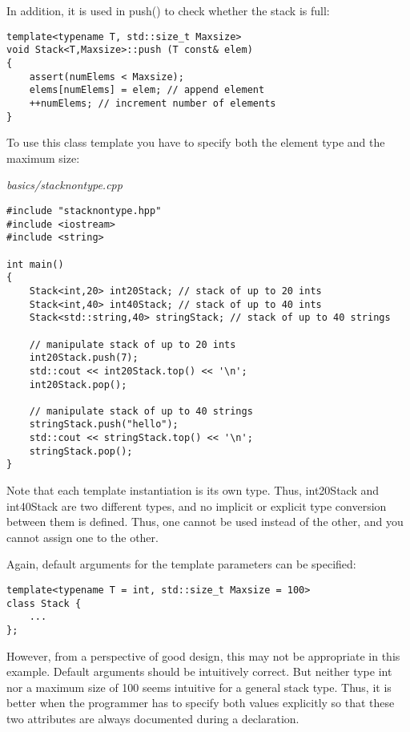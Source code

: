 In addition, it is used in push() to check whether the stack is full:

\begin{lstlisting}[style=styleCXX]
template<typename T, std::size_t Maxsize>
void Stack<T,Maxsize>::push (T const& elem)
{
	assert(numElems < Maxsize);
	elems[numElems] = elem; // append element
	++numElems; // increment number of elements
}
\end{lstlisting}

To use this class template you have to specify both the element type and the maximum size:

\noindent
\textit{basics/stacknontype.cpp}
\begin{lstlisting}[style=styleCXX]
#include "stacknontype.hpp"
#include <iostream>
#include <string>

int main()
{
	Stack<int,20> int20Stack; // stack of up to 20 ints
	Stack<int,40> int40Stack; // stack of up to 40 ints
	Stack<std::string,40> stringStack; // stack of up to 40 strings
	
	// manipulate stack of up to 20 ints
	int20Stack.push(7);
	std::cout << int20Stack.top() << '\n';
	int20Stack.pop();
	
	// manipulate stack of up to 40 strings
	stringStack.push("hello");
	std::cout << stringStack.top() << '\n';
	stringStack.pop();
}
\end{lstlisting}

Note that each template instantiation is its own type. Thus, int20Stack and int40Stack are two different types, and no implicit or explicit type conversion between them is defined. Thus, one cannot be used instead of the other, and you cannot assign one to the other.

Again, default arguments for the template parameters can be specified:

\begin{lstlisting}[style=styleCXX]
template<typename T = int, std::size_t Maxsize = 100>
class Stack {
	...
};
\end{lstlisting}

However, from a perspective of good design, this may not be appropriate in this example. Default arguments should be intuitively correct. But neither type int nor a maximum size of 100 seems intuitive for a general stack type. Thus, it is better when the programmer has to specify both values explicitly so that these two attributes are always documented during a declaration.





























